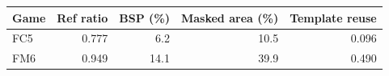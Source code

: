 \begin{tabular}{@{}lrrrr@{}}
\toprule
\textbf{Game} & \textbf{Ref ratio} & \textbf{BSP} (\%) & \textbf{Masked area} (\%) & \textbf{Template reuse} \\
\midrule
FC5 & 0.777 & 6.2 & 10.5 & 0.096 \\
FM6 & 0.949 & 14.1 & 39.9 & 0.490 \\
\bottomrule
\end{tabular}
